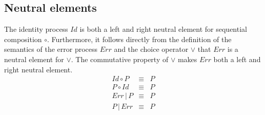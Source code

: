 \subsection{Neutral elements}
The identity process $Id$ is both a left and right neutral element for sequential composition $\circ$. Furthermore, it follows directly from the definition of the semantics of the error process $Err$ and the choice operator $\vee$ that $Err$ is a neutral element for $\vee$. The commutative property of $\vee$ makes $Err$ both a left and right neutral element.
\begin{eqnarray*}
  Id \circ P & \equiv & P \\
  P \circ Id & \equiv & P \\
  Err \,|\, P & \equiv & P \\
  P \,|\, Err & \equiv & P
\end{eqnarray*}